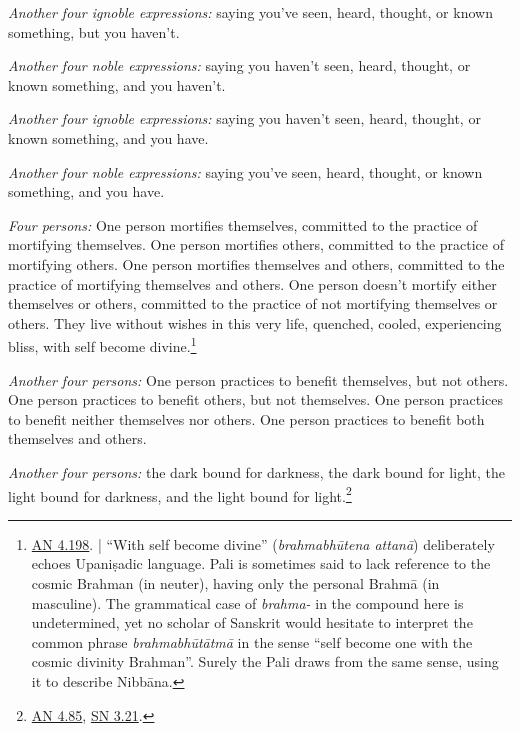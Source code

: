 \documentclass[12pt,openany]{book}%
\begin{document}
\emph{Another four ignoble expressions:} saying you’ve seen, heard, thought, or known something, but you haven’t. 

\emph{Another four noble expressions:} saying you haven’t seen, heard, thought, or known something, and you haven’t. 

\emph{Another four ignoble expressions:} saying you haven’t seen, heard, thought, or known something, and you have. 

\emph{Another four noble expressions:} saying you’ve seen, heard, thought, or known something, and you have. 

\emph{Four persons:} One person mortifies themselves, committed to the practice of mortifying themselves. One person mortifies others, committed to the practice of mortifying others. One person mortifies themselves and others, committed to the practice of mortifying themselves and others. One person doesn’t mortify either themselves or others, committed to the practice of not mortifying themselves or others. They live without wishes in this very life, quenched, cooled, experiencing bliss, with self become divine.\footnote{\href{https://suttacentral.net/an4.198/en/sujato}{AN 4.198}. | “With self become divine” (\textit{\textsanskrit{brahmabhūtena} \textsanskrit{attanā}}) deliberately echoes \textsanskrit{Upaniṣadic} language. Pali is sometimes said to lack reference to the cosmic Brahman (in neuter), having only the personal \textsanskrit{Brahmā} (in masculine). The grammatical case of \textit{brahma-} in the compound here is undetermined, yet no scholar of Sanskrit would hesitate to interpret the common phrase \textit{\textsanskrit{brahmabhūtātmā}} in the sense “self become one with the cosmic divinity Brahman”. Surely the Pali draws from the same sense, using it to describe \textsanskrit{Nibbāna}. } 

\emph{Another four persons:} One person practices to benefit themselves, but not others. One person practices to benefit others, but not themselves. One person practices to benefit neither themselves nor others. One person practices to benefit both themselves and others. 

\emph{Another four persons:} the dark bound for darkness, the dark bound for light, the light bound for darkness, and the light bound for light.\footnote{\href{https://suttacentral.net/an4.85/en/sujato}{AN 4.85}, \href{https://suttacentral.net/sn3.21/en/sujato}{SN 3.21}. } 
\end{document}
